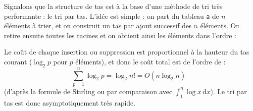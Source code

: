 Signalons que la structure de tas est à la base d'une méthode de tri très performante : le tri par tas. L'idée est simple : on part du tableau \texttt{a} de $n$ éléments à trier, et on construit un tas par ajout successif des $n$ éléments. On retire ensuite toutes les racines et on obtient ainsi les éléments dans l'ordre :



Le coût de chaque insertion ou suppression est proportionnel à la hauteur du tas courant ($\log_2p$ pour $p$ éléments), et donc le coût total est de l'ordre de :
\[
\sum_{p=1}^{n}\log_2p=\log_2n!=O(n\log_2n)
\]
(d'après la formule de Stirling ou par comparaison avec $\int_{1}^{n}\log x\,\mathrm{d}x$). Le tri par tas est donc asymptotiquement très rapide.
\bigskip

\Fin
